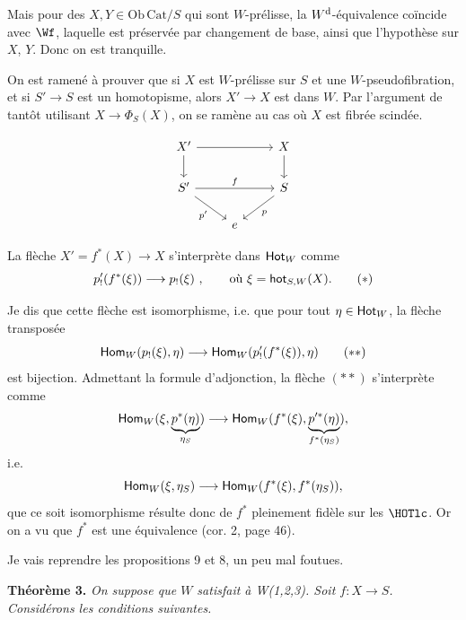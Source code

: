 Mais pour des $X, Y \in \mathrm{Ob}\,\mathrm{Cat}/S$ qui sont $W$-prélisse, la $W^{\mathrm{d}}$-équivalence coïncide avec $\Wf$, laquelle est préservée par changement de base, ainsi que l'hypothèse sur $X$, $Y$. Donc on est tranquille.

On est ramené à prouver que si $X$ est $W$-prélisse sur $S$ et une $W$-pseudofibration, et si $S' \longrightarrow S$ est un homotopisme, alors $X' \longrightarrow X$ est dans $W$. Par l'argument de tantôt utilisant $X \longrightarrow \Phi_S(X)$, on se ramène au cas où $X$ est fibrée scindée.


\[ \begin{tikzcd}
X' \arrow[rr] \arrow[d] & & X \arrow[d] \\
S' \arrow[rr, "f"] \arrow[dr, "p'"'] & & S \arrow[dl, "p"] \\
 & e &
\end{tikzcd} \]

La flèche $X' = f^*(X) \longrightarrow X$ s'interprète dans $\mathsf{Hot}_W$ comme
\[ p'_!(f^*(\xi)) \longrightarrow p_!(\xi) \ , \qquad \text{où } \xi = \hot_{S,W}(X). \tag*{$(*)$} \]

Je dis que cette flèche est isomorphisme, i.e. que pour tout $\eta \in \mathsf{Hot}_W$, la flèche transposée
\[ \Hom_W(p_!(\xi),\eta) \longrightarrow \Hom_W(p'_!(f^*(\xi)),\eta) \tag*{$(**)$} \]
est bijection. Admettant la formule d'adjonction, la flèche $(**)$ s'interprète comme
\[ \mathsf{Hom}_W(\xi,\underbrace{p^*(\eta)}_{\eta_S}) \longrightarrow \mathsf{Hom}_W(f^*(\xi),\underbrace{p'^*(\eta)}_{f^*(\eta_S)}), \]
i.e.
\[ \mathsf{Hom}_W(\xi,\eta_S) \longrightarrow \mathsf{Hom}_W(f^*(\xi),f^*(\eta_S)), \]
que ce soit isomorphisme résulte donc de $f^*$ pleinement fidèle sur les $\HOTlc$. Or on a vu que $f^*$ est une équivalence (cor. 2, page 46).

Je vais reprendre les propositions 9 et 8, un peu mal foutues.

\textbf{Théorème 3.} \textit{On suppose que $W$ satisfait à \textup{W(1,2,3)}. Soit $f : X \longrightarrow S$. Considérons les conditions suivantes.}

